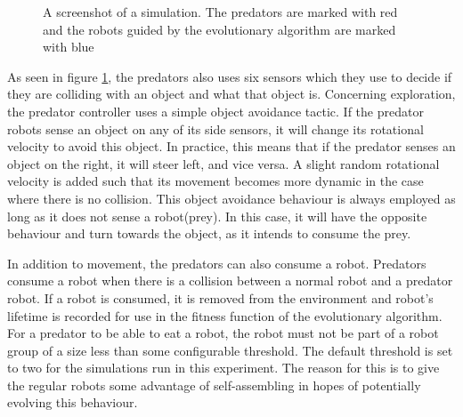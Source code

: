 \begin{figure}[H]
	\centering
	\caption{A screenshot of a simulation. The predators are marked with red and the robots guided by the evolutionary algorithm are marked with blue}
	\label{fig:predator_screendump}
\end{figure}

As seen in figure \ref{fig:predator_screendump}, the predators also uses six sensors which they use to decide if they are colliding with an object and what that object is.    
Concerning exploration, the predator controller uses a simple object avoidance tactic.
If the predator robots sense an object on any of its side sensors, it will change its rotational velocity to avoid this object.
In practice, this means that if the predator senses an object on the right, it will steer left, and vice versa.
A slight random rotational velocity is added such that its movement becomes more dynamic in the case where there is no collision.
This object avoidance behaviour is always employed as long as it does not sense a robot(prey).
In this case, it will have the opposite behaviour and turn towards the object, as it intends to consume the prey.

In addition to movement, the predators can also consume a robot. 
Predators consume a robot when there is a collision between a normal robot and a predator robot.
If a robot is consumed, it is removed from the environment and robot's lifetime is recorded for use in the fitness function of the evolutionary algorithm. 
For a predator to be able to eat a robot, the robot must not be part of a robot group of a size less than some configurable threshold.
The default threshold is set to two for the simulations run in this experiment.
The reason for this is to give the regular robots some advantage of self-assembling in hopes of potentially evolving this behaviour. 

